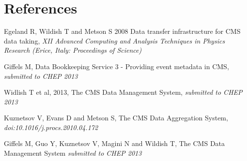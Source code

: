 \section*{References}

\begin{thebibliography}{1}
  Egeland R, Wildish T and Metson S 2008 Data transfer infrastructure for CMS data taking,  {\it XII Advanced Computing and Analysis Techniques in Physics Research (Erice, Italy: Proceedings of Science)}

Giffels M, Data Bookkeeping Service 3 - Providing event metadata in CMS, {\it submitted to CHEP 2013}

 Widlish T et al, 2013, The CMS Data Management System,
{\it submitted to CHEP 2013}

Kuznetsov V, Evans D and Metson S, The CMS Data Aggregation System,
{\it doi:10.1016/j.procs.2010.04.172}

Giffels M, Guo Y, Kuznetsov V, Magini N and Wildish T, The CMS Data Management System {\it submitted to CHEP 2013}

\end{thebibliography}
